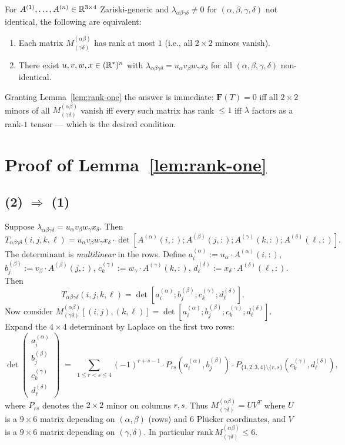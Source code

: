 \begin{lemma}\label{lem:rank-one}
For $A^{(1)},\ldots,A^{(n)}\in\mathbb{R}^{3\times 4}$ Zariski-generic and $\lambda_{\alpha\beta\gamma\delta}\neq 0$ for $(\alpha,\beta,\gamma,\delta)$ not identical, the following are equivalent:
\begin{enumerate}
\item Each matrix $M^{(\alpha\beta)}_{(\gamma\delta)}$ has rank at most $1$ (i.e., all $2\times 2$ minors vanish).
\item There exist $u,v,w,x\in(\mathbb{R}^*)^n$ with $\lambda_{\alpha\beta\gamma\delta} = u_\alpha v_\beta w_\gamma x_\delta$ for all $(\alpha,\beta,\gamma,\delta)$ non-identical.
\end{enumerate}
\end{lemma}

Granting Lemma~\ref{lem:rank-one} the answer is immediate: $\mathbf F(T)=0$ iff all $2\times 2$ minors of all $M^{(\alpha\beta)}_{(\gamma\delta)}$ vanish iff every such matrix has rank $\leq 1$ iff $\lambda$ factors as a rank-$1$ tensor --- which is the desired condition.

\section{Proof of Lemma~\ref{lem:rank-one}}

\subsection{(2) $\Rightarrow$ (1)}

Suppose $\lambda_{\alpha\beta\gamma\delta} = u_\alpha v_\beta w_\gamma x_\delta$. Then
\[
   T_{\alpha\beta\gamma\delta}(i,j,k,\ell) = u_\alpha v_\beta w_\gamma x_\delta\cdot \det[A^{(\alpha)}(i,:); A^{(\beta)}(j,:); A^{(\gamma)}(k,:); A^{(\delta)}(\ell,:)].
\]
The determinant is \emph{multilinear} in the rows. Define $a^{(\alpha)}_i := u_\alpha\cdot A^{(\alpha)}(i,:)$, $b^{(\beta)}_j := v_\beta\cdot A^{(\beta)}(j,:)$, $c^{(\gamma)}_k := w_\gamma\cdot A^{(\gamma)}(k,:)$, $d^{(\delta)}_\ell := x_\delta\cdot A^{(\delta)}(\ell,:)$. Then
\[
   T_{\alpha\beta\gamma\delta}(i,j,k,\ell) = \det[a^{(\alpha)}_i; b^{(\beta)}_j; c^{(\gamma)}_k; d^{(\delta)}_\ell].
\]
Now consider $M^{(\alpha\beta)}_{(\gamma\delta)}[(i,j),(k,\ell)]=\det[a^{(\alpha)}_i;b^{(\beta)}_j;c^{(\gamma)}_k;d^{(\delta)}_\ell]$. Expand the $4\times 4$ determinant by Laplace on the first two rows:
\[
   \det\!\begin{pmatrix}a^{(\alpha)}_i \\ b^{(\beta)}_j\\ c^{(\gamma)}_k \\ d^{(\delta)}_\ell\end{pmatrix}
   \;=\; \sum_{1\leq r<s\leq 4} (-1)^{r+s-1}\cdot P_{rs}(a^{(\alpha)}_i,b^{(\beta)}_j)\cdot P_{\{1,2,3,4\}\setminus\{r,s\}}(c^{(\gamma)}_k,d^{(\delta)}_\ell),
\]
where $P_{rs}$ denotes the $2\times 2$ minor on columns $r,s$. Thus $M^{(\alpha\beta)}_{(\gamma\delta)} = U V^T$ where $U$ is a $9\times 6$ matrix depending on $(\alpha,\beta)$ (rows) and 6 Plücker coordinates, and $V$ is a $9\times 6$ matrix depending on $(\gamma,\delta)$. In particular $\mathrm{rank}\,M^{(\alpha\beta)}_{(\gamma\delta)}\leq 6$.

